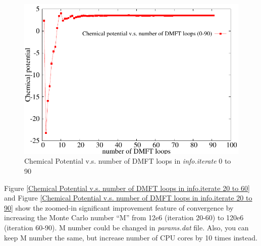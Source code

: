 \documentclass[12 pt]{article}
\begin{document}
\begin{itemize}[leftmargin=0.2in]
\begin{itemize}[leftmargin=0.5in]
  \begin{figure}[ht]
    \centering
    \captionsetup{justification=centering}
    \caption{Chemical Potential v.s. number of DMFT loops in \emph{info.iterate} 0 to 90}
    \label{Chemical Potential v.s. number of DMFT loops in info.iterate 0 to 90}
    \vspace{2ex}
    \includegraphics[scale=0.8]{gnuplotChemicalPotential1}
  \end{figure}

  Figure \ref{Chemical Potential v.s. number of DMFT loops in info.iterate 20 to 60} and Figure 
\ref{Chemical Potential v.s. number of DMFT loops in info.iterate 20 to 90} show the zoomed-in significant 
improvement feature of convergence by increasing the Monte Carlo number ``M'' from 12e6 (iteration 20-60) to 120e6 
(iteration 60-90). M number could be changed in \emph{params.dat} file. Also, you can keep M number the same, but
increase number of CPU cores by 10 times instead.  

  \cleardoublepage


\end{itemize}
\end{itemize}
\end{document}
